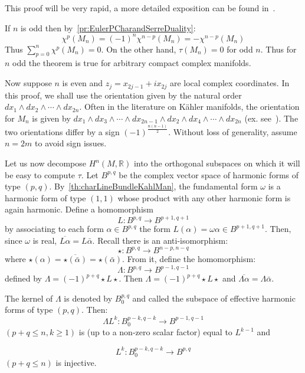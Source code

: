 \documentclass{book}
\newenvironment{Proof}[1][]
  {\begin{ProofTcb}[#1]}
  {\end{ProofTcb}}
\newcommand{\R}{{\mathbb{R}}}
\begin{document}
\begin{Proof}
  This proof will be very rapid, a more detailed exposition can be found
  in~\cite[theorem~15.8.2]{hirzebruchTopologicalMethodsAlgebraic1995}.

  If $n$ is odd then
  by~\cref{pr:EulerPCharandSerreDuality}:
  \[
      \chi^p(M_n) = (-1)^n \chi^{n-p}(M_n) = -\chi^{n-p}(M_n)
  \]
  Thus $\sum_{p=0}^n \chi^p(M_n) = 0$. On the other hand, $\tau(M_n) = 0$ for odd $n$. Thus for $n$ odd the theorem is true for arbitrary compact complex manifolds.

  Now suppose $n$ is even and $z_j = x_{2j-1} + i x_{2j}$ are local complex coordinates. In this proof, we
  shall use the orientation
  given by the natural order $dx_1 \wedge dx_2 \wedge \cdots \wedge dx_{2n}$. Often in the literature on K\"ahler
  manifolds, the orientation for $M_n$ is given by $dx_1 \wedge dx_3 \wedge \cdots \wedge dx_{2n-1} \wedge dx_2
  \wedge dx_4 \wedge \cdots \wedge dx_{2n}$ (ex. see~\cite{hodge1951kahler}). The two orientations differ by a
  sign $(-1)^{\frac{n(n-1)}{2}}$. Without loss of generality, assume $n = 2m$ to avoid sign issues.

  Let us now decompose $H^n(M, \R)$ into the orthogonal subspaces on which it will be easy to compute $\tau$.
  Let $B^{p,q}$ be the complex vector space of harmonic forms of type $(p,q)$.
  By~\cref{th:charLineBundleKahlMan}, the fundamental form $\omega$ is a harmonic form of type $(1,1)$ whose
  product with any other harmonic form is again harmonic. Define a homomorphism
  \[
      L: B^{p,q} \to B^{p+1,q+1}
  \]
  by associating to each form $\alpha \in B^{p,q}$ the form $L(\alpha) = \omega \alpha \in B^{p+1,q+1}$. Then,
  since $\omega$ is real, $\overline{L\alpha} = L\bar{\alpha}$. Recall there is an anti-isomorphism:
  \[
      \star: B^{p,q} \to B^{n-p,n-q}
  \]
  where $\star(\alpha) = \overline{\star(\bar{\alpha})} = \star(\bar{\alpha})$. From it, define the
  homomorphism:
  \[
      \Lambda: B^{p,q} \to B^{p-1,q-1}
  \]
  defined by $\Lambda = (-1)^{p+q}\star L\star$. Then $\Lambda = (-1)^{p+q}\star L\star$ and $\overline{\Lambda\alpha} = \Lambda\bar{\alpha}$.

  The kernel of $\Lambda$ is denoted by $B_0^{p,q}$ and called the subspace of effective harmonic forms of
  type $(p,q)$. Then:
  \[
    \Lambda L^k: B_0^{p-k,q-k} \to B^{p-1,q-1}
  \]
  $(p+q \leq n, k \geq 1)$ is (up to a non-zero scalar factor) equal to $L^{k-1}$ and

  \[
    L^k: B_0^{p-k,q-k} \to B^{p,q}
  \]
  $(p+q \leq n)$ is injective.


\end{Proof}
\end{document}
